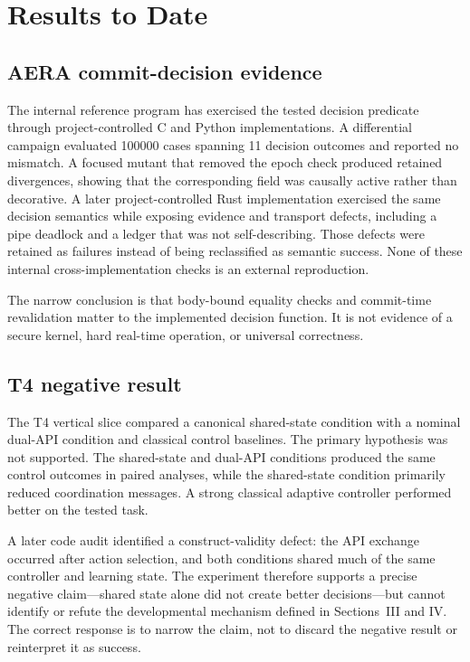 \documentclass[journal,10pt]{IEEEtran}
\begin{document}
\section{Results to Date}
\subsection{AERA commit-decision evidence}
The internal reference program has exercised the tested decision predicate through project-controlled C and Python implementations. A differential campaign evaluated \num{100000} cases spanning 11 decision outcomes and reported no mismatch. A focused mutant that removed the epoch check produced retained divergences, showing that the corresponding field was causally active rather than decorative. A later project-controlled Rust implementation exercised the same decision semantics while exposing evidence and transport defects, including a pipe deadlock and a ledger that was not self-describing. Those defects were retained as failures instead of being reclassified as semantic success. None of these internal cross-implementation checks is an external reproduction.

The narrow conclusion is that body-bound equality checks and commit-time revalidation matter to the implemented decision function. It is not evidence of a secure kernel, hard real-time operation, or universal correctness.

\subsection{T4 negative result}
The T4 vertical slice compared a canonical shared-state condition with a nominal dual-API condition and classical control baselines. The primary hypothesis was not supported. The shared-state and dual-API conditions produced the same control outcomes in paired analyses, while the shared-state condition primarily reduced coordination messages. A strong classical adaptive controller performed better on the tested task.

A later code audit identified a construct-validity defect: the API exchange occurred after action selection, and both conditions shared much of the same controller and learning state. The experiment therefore supports a precise negative claim---shared state alone did not create better decisions---but cannot identify or refute the developmental mechanism defined in Sections~III and IV. The correct response is to narrow the claim, not to discard the negative result or reinterpret it as success.
\end{document}

